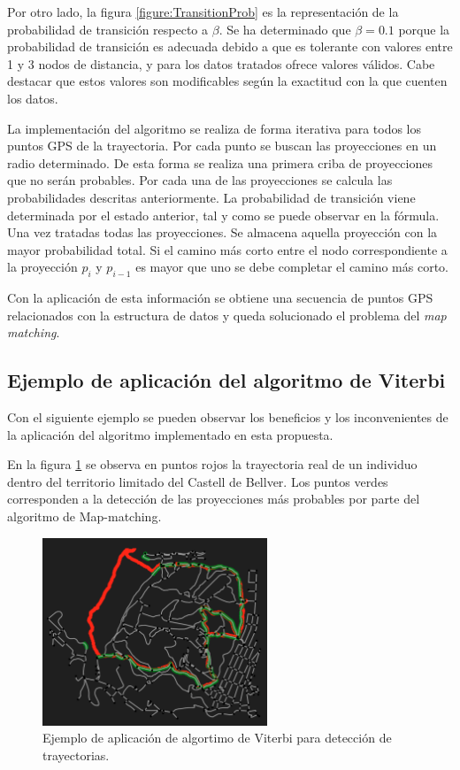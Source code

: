 Por otro lado, la figura \ref{figure:TransitionProb} es la representación de la 
probabilidad de transición respecto a $\beta$. Se ha determinado que $\beta = 0.1$ 
porque la probabilidad de transición es adecuada debido a que es tolerante con valores 
entre 1 y 3 nodos de distancia, y para los datos tratados ofrece valores válidos. Cabe 
destacar que estos valores son modificables según la exactitud con la que cuenten los 
datos.

La implementación del algoritmo se realiza de forma iterativa para todos los puntos 
\ac{GPS} de la trayectoria. Por cada punto se buscan las proyecciones en un radio 
determinado. De esta forma se realiza una primera criba de proyecciones que no serán 
probables. Por cada una de las proyecciones se calcula las probabilidades descritas 
anteriormente. La probabilidad de transición viene determinada por el estado anterior, 
tal y como se puede observar en la fórmula. Una vez tratadas todas las proyecciones. 
Se almacena aquella proyección con la mayor probabilidad total. Si el camino más corto 
entre el nodo correspondiente a la proyección $p_{i}$ y $p_{i-1}$ es mayor que uno se 
debe completar el camino más corto. 

Con la aplicación de esta información se obtiene una secuencia de puntos \ac{GPS} 
relacionados con la estructura de datos y queda solucionado el problema del 
\textit{map matching}.

\subsection{Ejemplo de aplicación del algoritmo de Viterbi}
Con el siguiente ejemplo se pueden observar los beneficios y los inconvenientes de la 
aplicación del algoritmo implementado en esta propuesta.

En la figura \ref{figure:MapMatching1} se observa en puntos rojos la trayectoria real de 
un individuo dentro del territorio limitado del Castell de Bellver. Los puntos verdes 
corresponden a la detección de las proyecciones más probables por parte del algoritmo 
de Map-matching.

\begin{figure}[htb]
\begin{center}
\includegraphics[width=0.6\textwidth]{./Imagenes/MapMatching1.png}
\caption{Ejemplo de aplicación de algortimo de Viterbi para detección de trayectorias.}
\label{figure:MapMatching1}
\end{center}
\end{figure}

